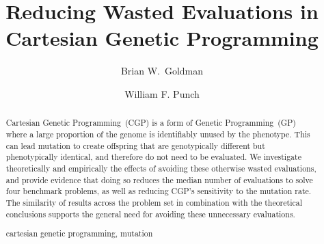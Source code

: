 \documentclass[runningheads,a4paper]{llncs}
\newcommand{\keywords}[1]{\par\addvspace\baselineskip
\noindent\keywordname\enspace\ignorespaces#1}
\begin{document}
\mainmatter  %

\title{Reducing Wasted Evaluations in Cartesian Genetic Programming}


%
%
\author{Brian W.~Goldman\and William F. Punch}
%



%
%

\maketitle


\begin{abstract}
Cartesian Genetic Programming~(CGP) is a form of Genetic Programming~(GP)
where a large proportion of the genome is identifiably unused
by the phenotype.  This can lead mutation to create offspring that are 
genotypically different but phenotypically identical, and therefore do
not need to be evaluated.  We investigate theoretically and empirically
the effects of avoiding these otherwise wasted evaluations, and provide
evidence that doing so reduces the median number of evaluations to solve
four benchmark problems, as well as reducing CGP's sensitivity to the mutation
rate.  The similarity of results across the problem set in combination with the
theoretical conclusions supports the general need for avoiding these unnecessary
evaluations.


\keywords{cartesian genetic programming, mutation}
\end{abstract}
\end{document}
